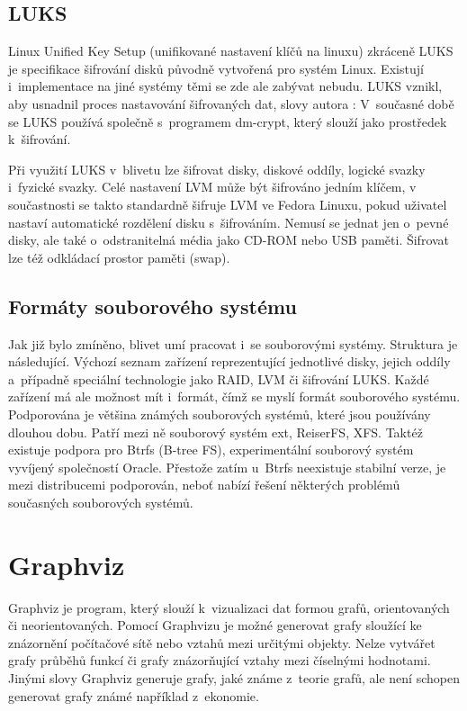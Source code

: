 \documentclass[color,table,oneside,nolot,nolof]{fithesis}
\begin{document}
\subsection{LUKS}
	Linux Unified Key Setup (unifikované nastavení klíčů na linuxu) zkráceně LUKS je specifikace šifrování disků původně vytvořená pro systém Linux. Existují i~implementace na jiné 
	systémy
	těmi se zde ale zabývat nebudu. LUKS vznikl, aby usnadnil proces nastavování šifrovaných dat, slovy autora : \cite{on-disk-format} V~současné době se LUKS používá společně s~programem dm-crypt, který slouží jako prostředek k~šifrování.

	Při využití LUKS v~blivetu lze šifrovat disky, diskové oddíly, logické svazky i~fyzické svazky. Celé nastavení LVM může být šifrováno jedním klíčem, v součastnosti se takto 
	standardně šifruje LVM ve Fedora Linuxu, pokud uživatel nastaví automatické rozdělení disku s~šifrováním. Nemusí se jednat jen o~pevné disky, ale také o~odstranitelná média jako
	CD-ROM nebo USB paměti. Šifrovat lze též odkládací prostor paměti (swap).

\subsection{Formáty souborového systému}
  Jak již bylo zmíněno, blivet umí pracovat i~se souborovými systémy. Struktura je následující. Výchozí seznam zařízení reprezentující jednotlivé disky, jejich oddíly a~případně
	speciální technologie jako RAID, LVM či šifrování LUKS. Každé zařízení má ale možnost mít i~formát, čímž se myslí formát souborového systému. Podporována je většina známých 
	souborových
	systémů, které jsou používány dlouhou dobu. Patří mezi ně souborový systém ext, ReiserFS, XFS. Taktéž existuje podpora pro Btrfs (B-tree FS), experimentální souborový systém 
	vyvíjený společností Oracle. Přestože zatím u~Btrfs neexistuje stabilní verze, je mezi distribucemi podporován, neboť nabízí řešení některých problémů současných souborových systémů.

\section{Graphviz}
	Graphviz je program, který slouží k~vizualizaci dat formou grafů, orientovaných či neorientovaných. Pomocí Graphvizu je možné generovat grafy sloužící ke znázornění počítačové sítě nebo
	vztahů mezi určitými objekty. Nelze vytvářet grafy průběhů funkcí či grafy znázorňující vztahy mezi číselnými hodnotami. Jinými slovy Graphviz generuje grafy, jaké známe z~teorie grafů,
	ale není schopen generovat grafy známé například z~ekonomie.
\end{document}
